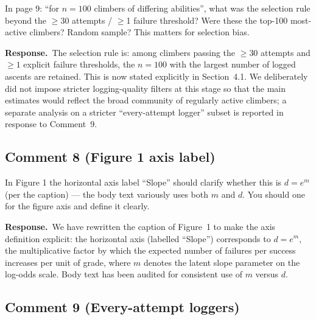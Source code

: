 \documentclass[11pt]{article}
\newenvironment{review}{\begingroup\color{revcolor}\itshape\par\noindent}{\par\endgroup}
\newcommand{\response}{\par\noindent\textbf{Response.}\ }
\begin{document}
\begin{review}
In page 9: ``for $n = 100$ climbers of differing abilities'', what was the selection rule beyond the $\geq$30 attempts / $\geq$1 failure threshold? Were these the top-100 most-active climbers? Random sample? This matters for selection bias.
\end{review}
\response The selection rule is: among climbers passing the $\geq 30$ attempts and $\geq 1$ explicit failure thresholds, the $n = 100$ with the largest number of logged ascents are retained. This is now stated explicitly in Section~4.1. We deliberately did not impose stricter logging-quality filters at this stage so that the main estimates would reflect the broad community of regularly active climbers; a separate analysis on a stricter ``every-attempt logger'' subset is reported in response to Comment~9.

\subsection*{Comment 8 (Figure 1 axis label)}

\begin{review}
In Figure 1 the horizontal axis label ``Slope'' should clarify whether this is $d = e^m$ (per the caption) --- the body text variously uses both $m$ and $d$. You should one for the figure axis and define it clearly.
\end{review}
\response We have rewritten the caption of Figure~1 to make the axis definition explicit: the horizontal axis (labelled ``Slope'') corresponds to $d = e^m$, the multiplicative factor by which the expected number of failures per success increases per unit of grade, where $m$ denotes the latent slope parameter on the log-odds scale. Body text has been audited for consistent use of $m$ versus $d$.

\subsection*{Comment 9 (Every-attempt loggers)}
\end{document}
